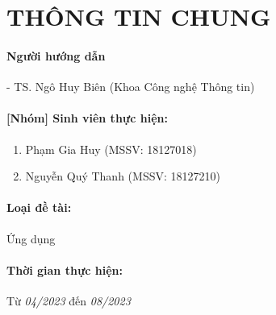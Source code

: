 \newpage

\section*{THÔNG TIN CHUNG}

\paragraph{Người hướng dẫn}
\tab - TS. Ngô Huy Biên (Khoa Công nghệ Thông tin)    

\paragraph{[Nhóm] Sinh viên thực hiện:}
\begin{enumerate}
    \item Phạm Gia Huy (MSSV: 18127018)
    \item Nguyễn Quý Thanh (MSSV: 18127210)
\end{enumerate}

\paragraph{Loại đề tài:}
Ứng dụng

\paragraph{Thời gian thực hiện:}
Từ \textsl{04/2023} đến \textsl{08/2023}
